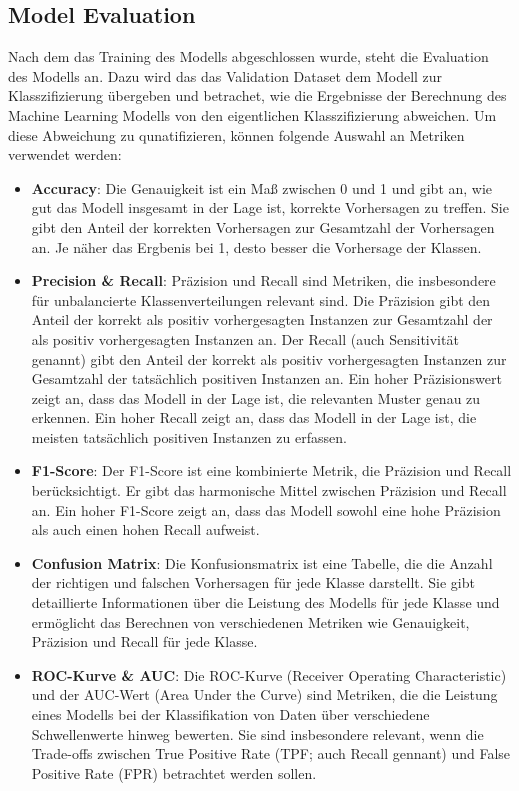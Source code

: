 \documentclass[conference]{IEEEtran}
\begin{document}
\subsection{Model Evaluation}

Nach dem das Training des Modells abgeschlossen wurde, steht die Evaluation des Modells an.
Dazu wird das das Validation Dataset dem Modell zur Klasszifizierung übergeben und betrachet, wie die Ergebnisse der Berechnung des Machine Learning Modells von den eigentlichen Klasszifizierung abweichen.
Um diese Abweichung zu qunatifizieren, können folgende Auswahl an Metriken verwendet werden:

\begin{itemize}
    \item \textbf{Accuracy}: Die Genauigkeit ist ein Maß zwischen 0 und 1 und gibt an, wie gut das Modell insgesamt in der Lage ist, korrekte Vorhersagen zu treffen. Sie gibt den Anteil der korrekten Vorhersagen zur Gesamtzahl der Vorhersagen an. Je näher das Ergbenis bei 1, desto besser die Vorhersage der Klassen.
    \item \textbf{Precision \& Recall}: Präzision und Recall sind Metriken, die insbesondere für unbalancierte Klassenverteilungen relevant sind. Die Präzision gibt den Anteil der korrekt als positiv vorhergesagten Instanzen zur Gesamtzahl der als positiv vorhergesagten Instanzen an. Der Recall (auch Sensitivität genannt) gibt den Anteil der korrekt als positiv vorhergesagten Instanzen zur Gesamtzahl der tatsächlich positiven Instanzen an.
          Ein hoher Präzisionswert zeigt an, dass das Modell in der Lage ist, die relevanten Muster genau zu erkennen. Ein hoher Recall zeigt an, dass das Modell in der Lage ist, die meisten tatsächlich positiven Instanzen zu erfassen.
    \item \textbf{F1-Score}: Der F1-Score ist eine kombinierte Metrik, die Präzision und Recall berücksichtigt. Er gibt das harmonische Mittel zwischen Präzision und Recall an. Ein hoher F1-Score zeigt an, dass das Modell sowohl eine hohe Präzision als auch einen hohen Recall aufweist.
    \item \textbf{Confusion Matrix}: Die Konfusionsmatrix ist eine Tabelle, die die Anzahl der richtigen und falschen Vorhersagen für jede Klasse darstellt. Sie gibt detaillierte Informationen über die Leistung des Modells für jede Klasse und ermöglicht das Berechnen von verschiedenen Metriken wie Genauigkeit, Präzision und Recall für jede Klasse.
    \item \textbf{ROC-Kurve \& AUC}: Die ROC-Kurve (Receiver Operating Characteristic) und der AUC-Wert (Area Under the Curve) sind Metriken, die die Leistung eines Modells bei der Klassifikation von Daten über verschiedene Schwellenwerte hinweg bewerten. Sie sind insbesondere relevant, wenn die Trade-offs zwischen True Positive Rate (TPF; auch Recall gennant) und False Positive Rate (FPR) betrachtet werden sollen.

\end{itemize}
\end{document}
